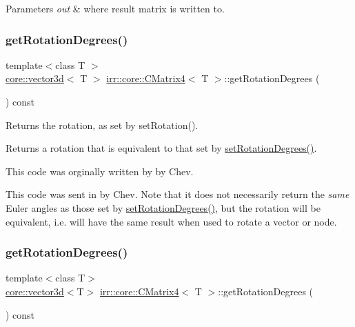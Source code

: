 \begin{DoxyParams}{Parameters}
{\em out} & where result matrix is written to. \\
\hline
\end{DoxyParams}
\mbox{\label{classirr_1_1core_1_1CMatrix4_ad334281fcd12eb5acda020981706b759}} 
\subsubsection{\texorpdfstring{get\+Rotation\+Degrees()}{getRotationDegrees()}\hspace{0.1cm}{\footnotesize\ttfamily [1/2]}}
{\footnotesize\ttfamily template$<$class T $>$ \\
\hyperlink{classirr_1_1core_1_1vector3d}{core\+::vector3d}$<$ T $>$ \hyperlink{classirr_1_1core_1_1CMatrix4}{irr\+::core\+::\+C\+Matrix4}$<$ T $>$\+::get\+Rotation\+Degrees (\begin{DoxyParamCaption}{ }\end{DoxyParamCaption}) const\hspace{0.3cm}{\ttfamily [inline]}}



Returns the rotation, as set by set\+Rotation(). 

Returns a rotation that is equivalent to that set by \hyperlink{classirr_1_1core_1_1CMatrix4_a8ee5ef8619d4b0f56d72ac84495ed644}{set\+Rotation\+Degrees()}.

This code was orginally written by by Chev.

This code was sent in by Chev. Note that it does not necessarily return the {\itshape same} Euler angles as those set by \hyperlink{classirr_1_1core_1_1CMatrix4_a8ee5ef8619d4b0f56d72ac84495ed644}{set\+Rotation\+Degrees()}, but the rotation will be equivalent, i.\+e. will have the same result when used to rotate a vector or node. \mbox{\label{classirr_1_1core_1_1CMatrix4_a10abcf70d27d7b274e6277e1e1ee5907}} 
\subsubsection{\texorpdfstring{get\+Rotation\+Degrees()}{getRotationDegrees()}\hspace{0.1cm}{\footnotesize\ttfamily [2/2]}}
{\footnotesize\ttfamily template$<$class T$>$ \\
\hyperlink{classirr_1_1core_1_1vector3d}{core\+::vector3d}$<$T$>$ \hyperlink{classirr_1_1core_1_1CMatrix4}{irr\+::core\+::\+C\+Matrix4}$<$ T $>$\+::get\+Rotation\+Degrees (\begin{DoxyParamCaption}{ }\end{DoxyParamCaption}) const}



